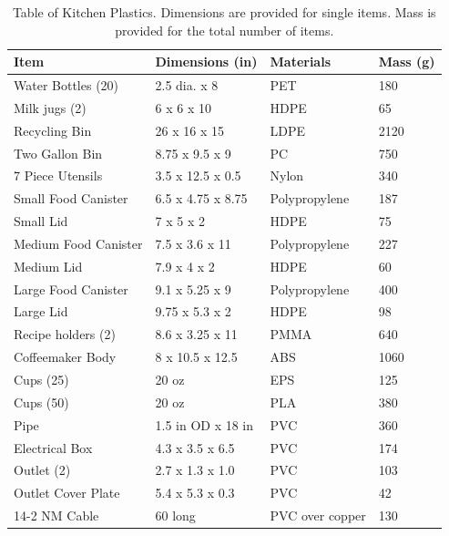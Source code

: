 \documentclass[12pt,oneside]{book}
\begin{document}
\begin{table}[!ht]
	\centering
	\caption{Table of Kitchen Plastics. Dimensions are provided for single items.  Mass is provided for the total number of items.}
	\label{tab:KitPlastics}
	\begin{tabular}{llll}
		\toprule[1.5pt]
		Item 				& Dimensions (in) 	& Materials 										& Mass (g)  \\
		\midrule
		Water Bottles (20) 	& 2.5 dia. x 8  	& PET												&  180      \\
		Milk jugs (2)     	& 6 x 6 x 10  		& HDPE											   	&   65      \\
		Recycling Bin  		& 26 x 16 x 15	    & LDPE						  						& 2120     \\
		Two Gallon Bin  	& 8.75 x 9.5 x 9	& PC 							 					&  750     \\	
		7 Piece Utensils	& 3.5 x 12.5 x 0.5	& Nylon											 	&  340   \\	
		Small Food Canister	& 6.5 x 4.75 x 8.75	& Polypropylene							  			&  187   \\
		Small Lid			& 7 x 5 x 2			& HDPE												&   75  \\
		Medium Food Canister& 7.5 x 3.6 x 11 	& Polypropylene 									&  227   \\
		Medium Lid			& 7.9 x 4 x  2		& HDPE												&   60    \\
		Large Food Canister	& 9.1 x 5.25 x 9	& Polypropylene										&  400	 \\
		Large Lid 			& 9.75 x 5.3 x 2	& HDPE 												&   98    \\
		Recipe holders (2)	& 8.6 x 3.25 x 11   & PMMA												&  640	 \\
		Coffeemaker Body	& 8 x 10.5 x 12.5	& ABS 												& 1060   \\
		Cups (25)			& 20 oz				& EPS												&  125   \\
        Cups (50)			& 20 oz				& PLA  												&  380   \\
        Pipe                & 1.5 in OD x 18 in & PVC 												&  360   \\
        Electrical Box	    & 4.3 x 3.5 x 6.5	& PVC 												&  174  \\
        Outlet (2)			& 2.7 x 1.3 x 1.0	& PVC												&  103   \\
        Outlet Cover Plate  & 5.4 x 5.3 x 0.3	& PVC  												&   42   \\
        14-2 NM Cable 		& 60 long			& PVC over copper									&  130  \\
		\bottomrule[1.25pt]
	\end{tabular}
\end{table}
\end{document}
